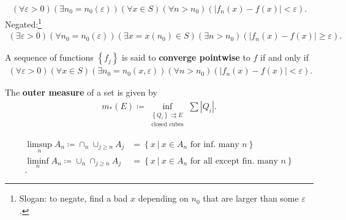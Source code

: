 \begin{definition}

\begin{align*}
(\forall \varepsilon>0)\left(\exists n_{0} = n_0(\varepsilon) \right)(\forall x \in S)\left(\forall n>n_{0}\right)\left(\left|f_{n}(x)-f(x)\right|<\varepsilon\right)
.\end{align*}
Negated:\footnote{Slogan: to negate, find a bad \(x\) depending on
  \(n_0\) that are larger than some \(\varepsilon\).}
\begin{align*}  
(\exists \varepsilon>0)\left(\forall n_{0} = n_0 (\varepsilon) \right)(\exists x = x(n_0) \in S)\left(\exists n>n_{0}\right)\left(\left|f_{n}(x)-f(x)\right| \geq \varepsilon\right)
.\end{align*}

\end{definition}

\begin{definition}

A sequence of functions \(\left\{{ f_j }\right\}\) is said to
\textbf{converge pointwise} to \(f\) if and only if
\begin{align*}  
(\forall \varepsilon>0)(\forall x \in S)\left(\exists n_{0} = n_0(x, \varepsilon) \right)\left(\forall n>n_{0}\right)\left(\left|f_{n}(x)-f(x)\right|<\varepsilon\right)
.\end{align*}

\end{definition}

\begin{definition}

The \textbf{outer measure} of a set is given by
\begin{align*}
m_*(E) \coloneqq\inf_{\substack{\left\{{Q_{i}}\right\} \rightrightarrows E \\ \text{closed cubes}}} \sum {\left\lvert {Q_{i}} \right\rvert}
.\end{align*}

\end{definition}

\begin{definition}

\begin{align*}
\limsup_{n} A_{n} \coloneqq\cap_{n} \cup_{j\geq n} A_{j}&= \left\{{x {~\mathrel{\Big|}~}x\in A_{n} \text{ for inf. many $n$}}\right\}  \\
\liminf_{n} A_{n} \coloneqq\cup_{n} \cap_{j\geq n} A_{j} &= \left\{{x {~\mathrel{\Big|}~}x\in A_{n} \text{ for all except fin. many $n$}}\right\}  \\
.\end{align*}

\end{definition}

